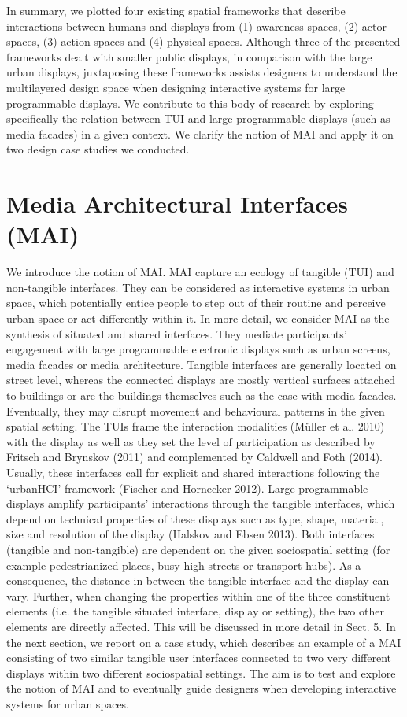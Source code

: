 In summary, we plotted four existing spatial frameworks that describe interactions
between humans and displays from (1) awareness spaces, (2) actor spaces,
(3) action spaces and (4) physical spaces. Although three of the presented frameworks
dealt with smaller public displays, in comparison with the large urban
displays, juxtaposing these frameworks assists designers to understand the multilayered
design space when designing interactive systems for large programmable
displays. We contribute to this body of research by exploring specifically the
relation between TUI and large programmable displays (such as media facades)
in a given context. We clarify the notion of MAI and apply it on two design case
studies we conducted.

\section{ Media Architectural Interfaces (MAI) }

We introduce the notion of MAI. MAI capture an ecology of tangible (TUI) and
non-tangible interfaces. They can be considered as interactive systems in urban
space, which potentially entice people to step out of their routine and perceive
urban space or act differently within it. In more detail, we consider MAI as the
synthesis of situated and shared interfaces. They mediate participants’ engagement
with large programmable electronic displays such as urban screens, media facades
or media architecture. Tangible interfaces are generally located on street level,
whereas the connected displays are mostly vertical surfaces attached to buildings
or are the buildings themselves such as the case with media facades. Eventually,
they may disrupt movement and behavioural patterns in the given spatial setting.
The TUIs frame the interaction modalities (Müller et al. 2010) with the display
as well as they set the level of participation as described by Fritsch and Brynskov
(2011) and complemented by Caldwell and Foth (2014). Usually, these interfaces
call for explicit and shared interactions following the ‘urbanHCI’ framework
(Fischer and Hornecker 2012). Large programmable displays amplify participants’ interactions through the tangible interfaces, which depend on technical properties
of these displays such as type, shape, material, size and resolution of the display
(Halskov and Ebsen 2013).
Both interfaces (tangible and non-tangible) are dependent on the given sociospatial
setting (for example pedestrianized places, busy high streets or transport hubs).
As a consequence, the distance in between the tangible interface and the display
can vary. Further, when changing the properties within one of the three constituent
elements (i.e. the tangible situated interface, display or setting), the two other elements
are directly affected. This will be discussed in more detail in Sect. 5.
In the next section, we report on a case study, which describes an example of
a MAI consisting of two similar tangible user interfaces connected to two very
different displays within two different sociospatial settings. The aim is to test and
explore the notion of MAI and to eventually guide designers when developing
interactive systems for urban spaces.